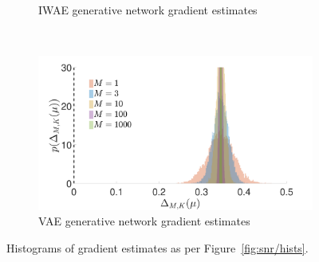 \begin{figure}[h]
\begin{subfigure}[b]{0.45\textwidth}
		\caption{\gls{IWAE} generative network gradient estimates \label{fig:hv/mu_hist_iwae}}
	\end{subfigure} ~~~~~~~~~~
	\begin{subfigure}[b]{0.45\textwidth}
		\centering
		\includegraphics[width=\textwidth]{figures/tighter_bounds/hv_mu_hist_VAE}
		\caption{\gls{VAE} generative network gradient estimates \label{fig:hv/mu_hist_vae}}
	\end{subfigure}
	\caption{Histograms of gradient estimates as per Figure~\ref{fig:snr/hists}.
		\label{fig:hv/hists}
	\vspace{-4pt}}
\end{figure}

